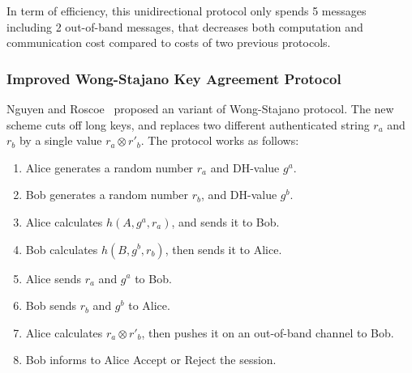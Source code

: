 In term of efficiency, this unidirectional protocol only spends 5 messages including 2 out-of-band messages, that decreases both computation and communication cost compared to costs of two previous protocols. 
\subsubsection*{Improved Wong-Stajano Key Agreement Protocol}

Nguyen and Roscoe~\cite{Nguyen09authenticationprotocols} proposed an variant of Wong-Stajano protocol. The new scheme cuts off long keys, and replaces two different authenticated string $r_a$ and $r_b$ by a single value $r_a\otimes r'_b$. The protocol works as follows:
\begin{enumerate}
\item Alice generates a random number $r_a$ and DH-value $g^a$.
\item Bob generates a random number $r_b$, and DH-value $g^b$.
\item Alice calculates $h(A,g^a,r_a)$, and sends it to Bob. 
\item Bob calculates $h(B,g^b,r_b)$, then sends it to Alice.
\item Alice sends $r_a$ and $g^a$ to Bob. 
\item Bob sends $r_b$ and $g^b$ to Alice. 
\item Alice calculates $r_a\otimes r'_b$, then pushes it on an out-of-band channel to Bob. 
\item Bob informs to Alice Accept or Reject the session.
\end{enumerate}

\begin{center}
\end{center}

